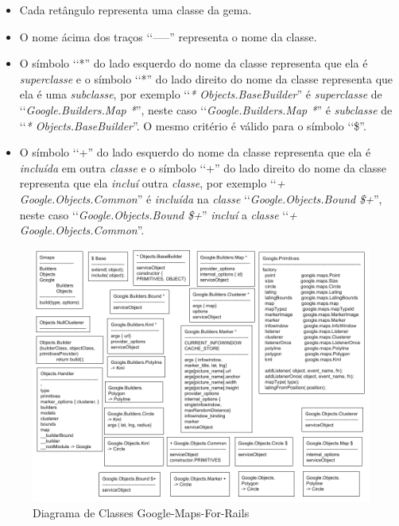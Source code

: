 \begin{itemize}

 \item Cada retângulo representa uma classe da gema.
 
 \item O nome ácima dos traços ‘‘-----'' representa o nome da classe.
 
 \item O símbolo ‘‘*'' do lado esquerdo do nome da classe representa que ela é \emph{superclasse} e o 
 símbolo ‘‘*'' do lado direito do nome da classe representa que ela é uma \emph{subclasse}, por exemplo
 ‘‘\emph{* Objects.BaseBuilder}'' é \emph{superclasse} de ‘‘\emph{Google.Builders.Map *}'', neste caso 
 ‘‘\emph{Google.Builders.Map *}'' é \emph{subclasse} de ‘‘\emph{* Objects.BaseBuilder}''. O mesmo 
 critério é válido para o símbolo ‘‘\$''.
 
 \item O símbolo ‘‘+'' do lado esquerdo do nome da classe representa que ela é \emph{incluída} em outra  
 \emph{classe} e o símbolo ‘‘+'' do lado direito do nome da classe representa que ela \emph{incluí} outra 
 \emph{classe}, por exemplo ‘‘\emph{+ Google.Objects.Common}'' é \emph{incluída} na \emph{classe} 
 ‘‘\emph{Google.Objects.Bound \$+}'', neste caso ‘‘\emph{Google.Objects.Bound \$+}'' \emph{incluí} a 
 \emph{classe} ‘‘\emph{+ Google.Objects.Common}''.
 
\end{itemize}

\begin{figure}[ht]
  \includegraphics[scale=0.48]{images/diagrama_de_classes_google_maps_for_rails.png}
  \caption{Diagrama de Classes Google-Maps-For-Rails}
  \label{fig:diagrama_de_classes_google_maps_for_rails}
\end{figure}

